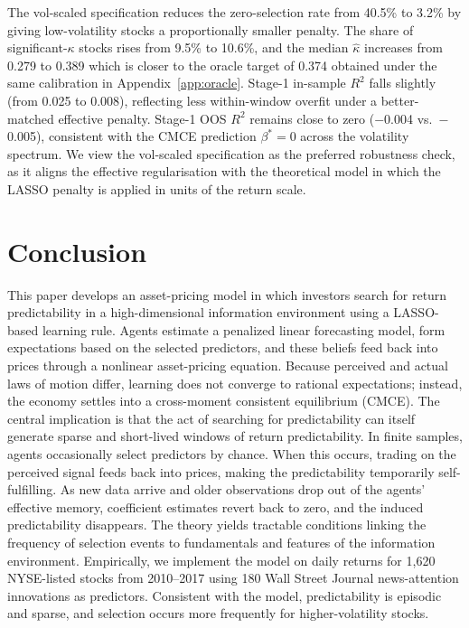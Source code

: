 \documentclass[11pt]{article}
\begin{document}
The vol-scaled specification reduces the zero-selection rate from 40.5\% to 3.2\%
by giving low-volatility stocks a proportionally smaller penalty.
The share of significant-$\kappa$ stocks rises from 9.5\% to 10.6\%, and the median
$\hat\kappa$ increases from 0.279 to 0.389 which is closer to the oracle target of 0.374
obtained under the same calibration in Appendix~\ref{app:oracle}.
Stage-1 in-sample $R^2$ falls slightly (from 0.025 to 0.008), reflecting less
within-window overfit under a better-matched effective penalty.
Stage-1 OOS $R^2$ remains close to zero ($-$0.004 vs.\ $-$0.005), consistent with
the CMCE prediction $\beta^*=0$ across the volatility spectrum.
We view the vol-scaled specification as the preferred robustness check, as it
aligns the effective regularisation with the theoretical model in which the
LASSO penalty is applied in units of the return scale.


\section{Conclusion}\label{sec:conclusion}

This paper develops an asset-pricing model in which investors search for return predictability in a high-dimensional information environment using a LASSO-based learning rule.
Agents estimate a penalized linear forecasting model, form expectations based on the selected predictors, and these beliefs feed back into prices through a nonlinear asset-pricing equation.
Because perceived and actual laws of motion differ, learning does not converge to rational expectations; instead, the economy settles into a cross-moment consistent equilibrium (CMCE).
The central implication is that the act of searching for predictability can itself generate sparse and short-lived windows of return predictability.
In finite samples, agents occasionally select predictors by chance.
When this occurs, trading on the perceived signal feeds back into prices, making the predictability temporarily self-fulfilling.
As new data arrive and older observations drop out of the agents’ effective memory, coefficient estimates revert back to zero, and the induced predictability disappears.
The theory yields tractable conditions linking the frequency of selection events to fundamentals and features of the information environment.
Empirically, we implement the model on daily returns for 1{,}620 NYSE-listed stocks from 2010--2017 using 180 Wall Street Journal news-attention innovations as predictors.
Consistent with the model, predictability is episodic and sparse, and selection occurs more frequently for higher-volatility stocks.
\end{document}
